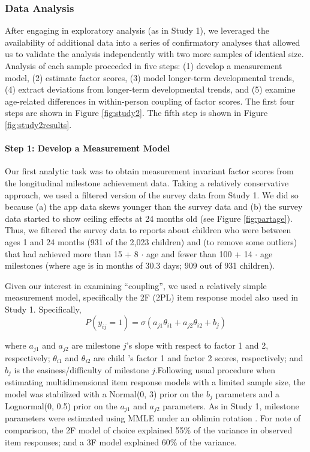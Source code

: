 \documentclass[man, floatsintext]{apa7}
\begin{document}
\subsubsection{Data Analysis}

After engaging in exploratory analysis (as in Study 1), we leveraged the availability of additional data into a series of confirmatory analyses that allowed us to validate the analysis independently with two more samples of identical size. Analysis of each sample proceeded in five steps: (1) develop a measurement model, (2) estimate
factor scores, (3) model longer-term developmental trends, (4) extract
deviations from longer-term developmental trends, and (5) examine
age-related differences in within-person coupling of factor scores. The
first four steps are shown in Figure \ref{fig:study2}. The fifth step is
shown in Figure \ref{fig:study2results}.

\paragraph{Step 1: Develop a Measurement
Model}
Our first analytic task was to obtain measurement invariant factor
scores from the longitudinal milestone achievement data. Taking a
relatively conservative approach, we used a filtered version of the
survey data from Study 1. We did so because (a) the app data skews younger than the
survey data and (b) the survey data started to show ceiling effects at
24 months old (see Figure \ref{fig:partage}). Thus, we filtered
the survey data to reports about children who were between ages 1 and 24 months (931 of the
2,023 children) and (to remove some outliers) that had achieved more than 15 + 8 $\cdot$ age and fewer
than 100 + 14 $\cdot$ age milestones (where age is in months of 30.3 days; 909
out of 931 children).

Given our interest in examining ``coupling'', we used a relatively simple measurement model, specifically the 2F (2PL) item response model also used in Study 1. Specifically,
\begin{equation}
P(y_{ij} = 1) = \sigma(a_{j1}\theta_{i1} + a_{j2}\theta_{i2} + b_j)
\end{equation}

\noindent where $a_{j1}$ and $a_{j2}$ are milestone $j$'s
slope with respect to factor 1 and 2, respectively; $\theta_{i1}$ and
$\theta_{i2}$ are child 's factor 1 and factor 2 scores, respectively;
and $b_j$ is the easiness/difficulty of milestone $j$.Following usual procedure when estimating
multidimensional item response models with a limited sample size, the model was stabilized with a Normal(0, 3)
prior on the $b_j$ parameters and a Lognormal(0, 0.5) prior on the $a_{j1}$ and
$a_{j2}$ parameters. As in Study 1, milestone
parameters were estimated using MMLE under an oblimin rotation \parencite{jennrich1966}. For note of comparison, the 2F model of choice explained 55\% of the variance in observed item responses; and a 3F model explained 60\% of the variance.
\end{document}
